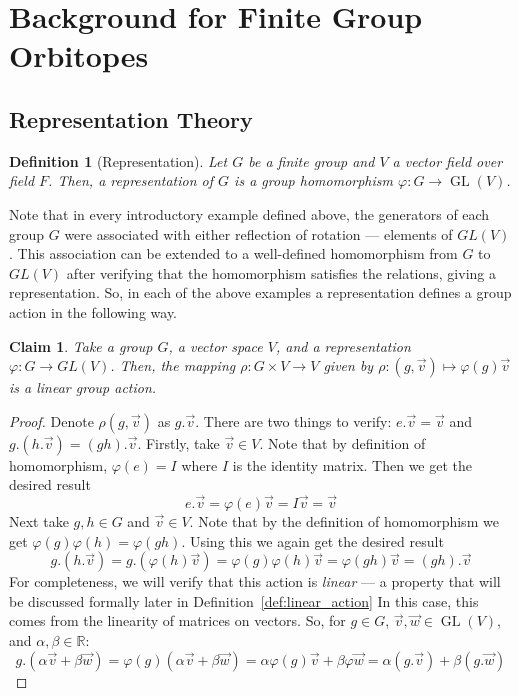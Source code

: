 \documentclass[12]{amsart}
\newtheorem{definition}[theorem]{Definition}
\newtheorem{claim}[theorem]{Claim}
\DeclareMathOperator{\GL}{GL}
\begin{document}
\section{Background for Finite Group Orbitopes}
\label{sec:finite_background}
\subsection{Representation Theory}

	\begin{definition}[Representation]
		Let $G$ be a finite group and $V$ a vector field over field $F$. Then, a \emph{representation} of $G$ is a group homomorphism $\varphi: G \to \GL(V)$.
	\end{definition}
		Note that in every introductory example defined above, the generators of each group $G$ were associated with either reflection of rotation --- elements of $GL(V)$. This association can be extended to a well-defined homomorphism from $G$ to $GL(V)$ after verifying that the homomorphism satisfies the relations, giving a representation. So, in each of the above examples a representation defines a group action in the following way.
	\begin{claim}
		Take a group $G$, a vector space $V$, and a representation $\varphi: G \to GL(V)$. Then, the mapping $\rho: G \times V \to V$ given by $\rho: (g,\vec{v}) \mapsto \varphi(g)\vec{v}$ is a linear group action.
	\label{thm:rep_action}
	\end{claim}
	\begin{proof}
	Denote $\rho(g,\vec{v})$ as $g.\vec{v}$.
	There are two things to verify: $e.\vec{v} = \vec{v}$ and $g.(h.\vec{v}) = (gh).\vec{v}$. Firstly, take $\vec{v} \in V$. Note that by definition of homomorphism, $\varphi(e) = I$ where $I$ is the identity matrix. Then we get the desired result
	$$ e.\vec{v} = \varphi(e)\vec{v} = I\vec{v} = \vec{v} $$
Next take $g,h \in G$ and $\vec{v} \in V$. Note that by the definition of homomorphism we get $\varphi(g)\varphi(h) = \varphi(gh)$. Using this we again get the desired result
	$$g.(h.\vec{v}) = g.(\varphi(h)\vec{v}) = \varphi(g)\varphi(h)\vec{v} = \varphi(gh)\vec{v} = (gh).\vec{v}$$
For completeness, we will verify that this action is \emph{linear} --- a property that will be discussed formally later in Definition~\ref{def:linear_action} In this case, this comes from the linearity of matrices on vectors. So, for $g \in G$, $\vec{v}, \vec{w} \in \GL(V)$, and $\alpha, \beta \in \mathbb{R}$:
	$$g.(\alpha \vec{v} + \beta \vec{w}) = \varphi(g)(\alpha \vec{v} + \beta \vec{w}) = \alpha \varphi(g) \vec{v} + \beta \varphi \vec{w} = \alpha (g.\vec{v}) + \beta (g.\vec{w})$$
	\end{proof}
\end{document}
